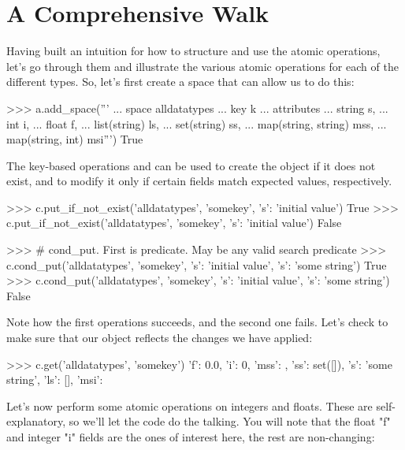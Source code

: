 \section{A Comprehensive Walk}
\label{sec:atomic-ops:walk}

Having built an intuition for how to structure and use the atomic operations,
let's go through them and illustrate the various atomic operations for each of
the different types. So, let's first create a space that can allow us to do
this:

\begin{pythoncode}
>>> a.add_space('''
... space alldatatypes
... key k
... attributes
...    string s,
...    int i,
...    float f,
...    list(string) ls,
...    set(string) ss,
...    map(string, string) mss,
...    map(string, int) msi''')
True
\end{pythoncode}

The key-based operations  and  can be
used to create the object if it does not exist, and to modify it only if certain
fields match expected values, respectively.

\begin{pythoncode}
>>> c.put_if_not_exist('alldatatypes', 'somekey', {'s': 'initial value'})
True
>>> c.put_if_not_exist('alldatatypes', 'somekey', {'s': 'initial value'})
False

>>> # cond_put.  First is predicate.  May be any valid search predicate
>>> c.cond_put('alldatatypes', 'somekey', {'s': 'initial value'}, {'s': 'some string'})
True
>>> c.cond_put('alldatatypes', 'somekey', {'s': 'initial value'}, {'s': 'some string'})
False
\end{pythoncode}

Note how the first operations succeeds, and the second one fails. Let's check to
make sure that our object reflects the changes we have applied:

\begin{pythoncode}
>>> c.get('alldatatypes', 'somekey')
{'f': 0.0, 'i': 0, 'mss': {}, 'ss': set([]), 's': 'some string', 'ls': [], 'msi': {}}
\end{pythoncode}

Let's now perform some atomic operations on integers and floats. These are
self-explanatory, so we'll let the code do the talking. You will note that the
float "f" and integer "i" fields are the ones of interest here, the rest are
non-changing:

